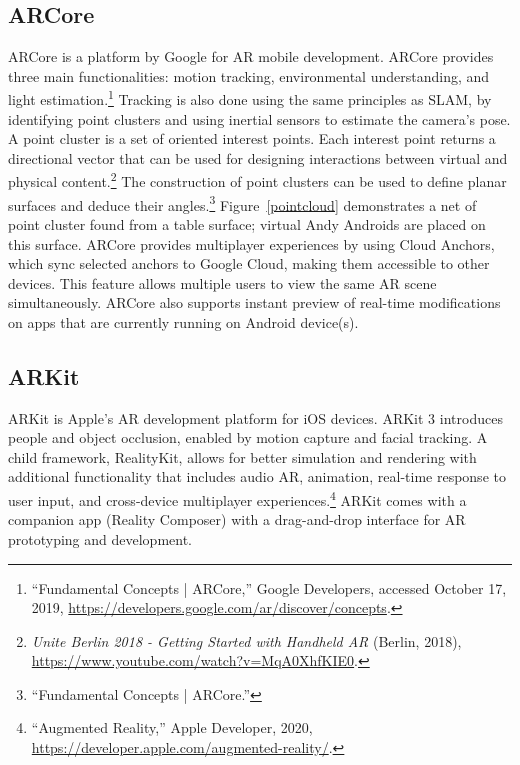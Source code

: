\subsection{ARCore} 
ARCore is a platform by Google for AR mobile development. ARCore provides three main functionalities: motion tracking, environmental understanding, and light estimation.\footnote{“Fundamental Concepts | ARCore,” Google Developers, accessed October 17, 2019, \url{https://developers.google.com/ar/discover/concepts}.} Tracking is also done using the same principles as SLAM, by identifying point clusters and using inertial sensors to estimate the camera’s pose. A point cluster is a set of oriented interest points. Each interest point returns a directional vector that can be used for designing interactions between virtual and physical content.\footnote{\textit{Unite Berlin 2018 - Getting Started with Handheld AR} (Berlin, 2018), \url{https://www.youtube.com/watch?v=MqA0XhfKIE0}.} The construction of point clusters can be used to define planar surfaces and deduce their angles.\footnote{“Fundamental Concepts | ARCore.”} Figure~\ref{pointcloud} demonstrates a net of point cluster found from a table surface; virtual Andy Androids are placed on this surface. ARCore provides multiplayer experiences by using Cloud Anchors, which sync selected anchors to Google Cloud, making them accessible to other devices. This feature allows multiple users to view the same AR scene simultaneously. ARCore also supports instant preview of real-time modifications on apps that are currently running on Android device(s).

\begin{figure}[!ht]
\vspace{-.1 in}
\end{figure}

\subsection{ARKit}
ARKit is Apple's AR development platform for iOS devices. ARKit 3 introduces people and object occlusion, enabled by motion capture and facial tracking. A child framework, RealityKit, allows for better simulation and rendering with additional functionality that includes audio AR, animation, real-time response to user input, and cross-device multiplayer experiences.\footnote{“Augmented Reality,” Apple Developer, 2020, \url{https://developer.apple.com/augmented-reality/}.} ARKit comes with a companion app (Reality Composer) with a drag-and-drop interface for AR prototyping and development.

